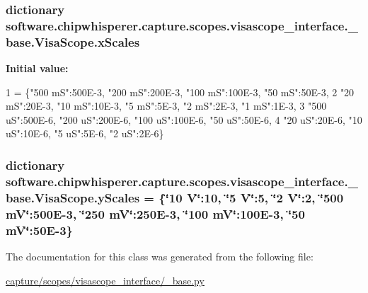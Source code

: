 \subsubsection[{x\+Scales}]{\setlength{\rightskip}{0pt plus 5cm}dictionary software.\+chipwhisperer.\+capture.\+scopes.\+visascope\+\_\+interface.\+\_\+base.\+Visa\+Scope.\+x\+Scales\hspace{0.3cm}{\ttfamily [static]}}\label{classsoftware_1_1chipwhisperer_1_1capture_1_1scopes_1_1visascope__interface_1_1__base_1_1VisaScope_ab74cc47f85321bdbb1389d3293ca644a}
{\bfseries Initial value\+:}
\begin{DoxyCode}
1 = \{\textcolor{stringliteral}{"500 mS"}:500E-3, \textcolor{stringliteral}{"200 mS"}:200E-3, \textcolor{stringliteral}{"100 mS"}:100E-3, \textcolor{stringliteral}{"50 mS"}:50E-3,
2                \textcolor{stringliteral}{"20 mS"}:20E-3, \textcolor{stringliteral}{"10 mS"}:10E-3, \textcolor{stringliteral}{"5 mS"}:5E-3, \textcolor{stringliteral}{"2 mS"}:2E-3, \textcolor{stringliteral}{"1 mS"}:1E-3,
3                \textcolor{stringliteral}{"500 uS"}:500E-6, \textcolor{stringliteral}{"200 uS"}:200E-6, \textcolor{stringliteral}{"100 uS"}:100E-6, \textcolor{stringliteral}{"50 uS"}:50E-6,
4                \textcolor{stringliteral}{"20 uS"}:20E-6, \textcolor{stringliteral}{"10 uS"}:10E-6, \textcolor{stringliteral}{"5 uS"}:5E-6, \textcolor{stringliteral}{"2 uS"}:2E-6\}
\end{DoxyCode}
\hypertarget{classsoftware_1_1chipwhisperer_1_1capture_1_1scopes_1_1visascope__interface_1_1__base_1_1VisaScope_a360d88817d0e4aad46ee2f617ff3666c}{}
\subsubsection[{y\+Scales}]{\setlength{\rightskip}{0pt plus 5cm}dictionary software.\+chipwhisperer.\+capture.\+scopes.\+visascope\+\_\+interface.\+\_\+base.\+Visa\+Scope.\+y\+Scales = \{\char`\"{}10 V\char`\"{}\+:10, \char`\"{}5 V\char`\"{}\+:5, \char`\"{}2 V\char`\"{}\+:2, \char`\"{}500 m\+V\char`\"{}\+:500\+E-\/3, \char`\"{}250 m\+V\char`\"{}\+:250\+E-\/3, \char`\"{}100 m\+V\char`\"{}\+:100\+E-\/3, \char`\"{}50 m\+V\char`\"{}\+:50\+E-\/3\}\hspace{0.3cm}{\ttfamily [static]}}\label{classsoftware_1_1chipwhisperer_1_1capture_1_1scopes_1_1visascope__interface_1_1__base_1_1VisaScope_a360d88817d0e4aad46ee2f617ff3666c}


The documentation for this class was generated from the following file\+:\begin{DoxyCompactItemize}
\item 
\hyperlink{capture_2scopes_2visascope__interface_2__base_8py}{capture/scopes/visascope\+\_\+interface/\+\_\+base.\+py}\end{DoxyCompactItemize}
